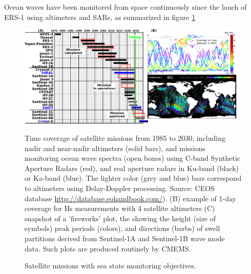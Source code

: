 Ocean waves have been monitored from space continuously since the lauch of ERS-1 using altimeters and SARs, as summarized in figure \ref{fig:satellite}
\begin{figure}[htb]
\centerline{\includegraphics[width=\textwidth]{FIGS_CH_SAT/missions.pdf}}
  \caption{Satellite missions with sea state monitoring objectives.}
    {Time coverage of satellite missions from 1985 to 2030, including nadir and near-nadir altimeters (solid bars), and missions monitoring ocean wave spectra (open boxes) using C-band Synthetic Aperture Radars (red), and real aperture radars in Ku-band (black) or Ka-band (blue). The lighter color (grey and blue) bars correspond to altimeters using Delay-Doppler processing. Source: CEOS database
    \url{http://database.eohandbook.com/}). (B) example of 1-day coverage for Hs measurements with 4 satellite altimeters 
    (C) snapshot of a 'fireworks' plot, the showing the height (size of symbols) peak periods (colors), and directions (barbs) of 
    swell partitions derived from Sentinel-1A and Sentinel-1B wave mode data. Such plots are produced routinely by CMEMS.}\label{fig:satellite}
\end{figure}


